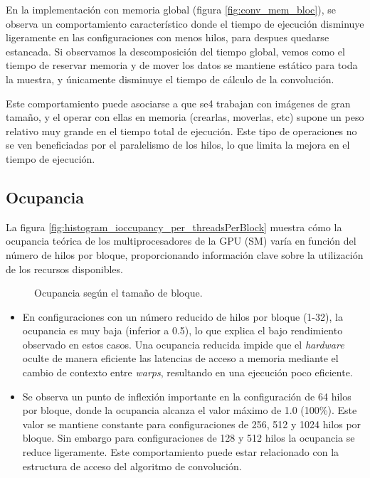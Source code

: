         En la implementación con memoria global (figura \ref{fig:conv_mem_bloc}), se observa un comportamiento característico donde el tiempo de ejecución disminuye ligeramente en las configuraciones con menos hilos, para despues quedarse estancada. Si observamos la descomposición del tiempo global, vemos como el tiempo de reservar memoria y de mover los datos se mantiene estático para toda la muestra, y únicamente disminuye el tiempo de cálculo de la convolución.

        Este comportamiento puede asociarse a que se4 trabajan con imágenes de gran tamaño, y el operar con ellas en memoria (crearlas, moverlas, etc) supone un peso relativo muy grande en el tiempo total de ejecución. Este tipo de operaciones no se ven beneficiadas por el paralelismo de los hilos, lo que limita la mejora en el tiempo de ejecución.
        
       

    \subsection{Ocupancia}

        La figura \ref{fig:histogram_ioccupancy_per_threadsPerBlock} muestra cómo la ocupancia teórica de los multiprocesadores de la GPU (SM) varía en función del número de hilos por bloque, proporcionando información clave sobre la utilización de los recursos disponibles.

        \begin{figure}[H]
            \centering
            \caption{Ocupancia según el tamaño de bloque.}
            \label{fig:conv2d_ioccupancy_per_threadsPerBlock}
        \end{figure}

        \begin{itemize}
        
            \item En configuraciones con un número reducido de hilos por bloque (1-32), la ocupancia es muy baja (inferior a 0.5), lo que explica el bajo rendimiento observado en estos casos. Una ocupancia reducida impide que el \textit{hardware} oculte de manera eficiente las latencias de acceso a memoria mediante el cambio de contexto entre \textit{warps}, resultando en una ejecución poco eficiente.
            
            \item Se observa un punto de inflexión importante en la configuración de 64 hilos por bloque, donde la ocupancia alcanza el valor máximo de 1.0 (100\%). Este valor se mantiene constante para configuraciones de 256, 512 y 1024 hilos por bloque. Sin embargo para configuraciones de 128 y 512 hilos la ocupancia se reduce ligeramente. Este comportamiento puede estar relacionado con la estructura de acceso del algoritmo de convolución.
        \end{itemize}
               
